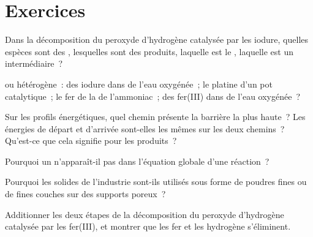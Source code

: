 \section{Exercices}


\begin{exercise}[$\star$]\label{exo:g12:catalysis:1}
Dans la décomposition du peroxyde d'hydrogène catalysée par les 
iodure, quelles espèces sont des , lesquelles sont des produits,
laquelle est le , laquelle est un intermédiaire~?
\end{exercise}

\begin{exercise}[$\star$]\label{exo:g12:catalysis:2}
 ou hétérogène~: des  iodure dans de l'eau
oxygénée~; le platine d'un pot catalytique~; le fer de la  de
l'ammoniac~; des  fer(III) dans de l'eau oxygénée~?
\end{exercise}

\begin{exercise}[$\star$]\label{exo:g12:catalysis:3}
Sur les profils énergétiques, quel chemin présente la barrière la plus
haute~? Les énergies de départ et d'arrivée sont-elles les mêmes sur les
deux chemins~? Qu'est-ce que cela signifie pour les produits~?
\end{exercise}

\begin{exercise}[$\star$]\label{exo:g12:catalysis:4}
Pourquoi un  n'apparaît-il pas dans l'équation globale d'une
réaction~?
\end{exercise}

\begin{exercise}[$\star$]\label{exo:g12:catalysis:5}
Pourquoi les  solides de l'industrie sont-ils utilisés sous
forme de poudres fines ou de fines couches sur des supports poreux~?
\end{exercise}

\begin{exercise}[$\star\star$]\label{exo:g12:catalysis:6}
Additionner les deux étapes de la décomposition du peroxyde d'hydrogène
catalysée par les  fer(III), et montrer que les  fer et les 
hydrogène s'éliminent.
\end{exercise}

